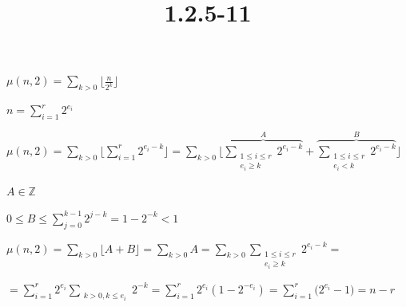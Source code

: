 \documentclass{article}
\title{1.2.5-11}
\begin{document}
\maketitle

\( \mu(n,2) = \sum_{k > 0}{\lfloor{\frac{n}{2^k}}\rfloor} \)

\( n = \sum_{i=1}^r 2^{e_i} \)

\( \mu(n,2) = \sum_{k > 0}{\lfloor{\sum_{i=1}^r 2^{e_i-k}}\rfloor} = \sum_{k > 0}{\lfloor{\overbrace{\sum_{\substack{1 \leq i \leq r\\ e_i \geq k}} 2^{e_i-k}}^A + \overbrace{\sum_{\substack{1 \leq i \leq r\\ e_i < k}} 2^{e_i-k}}^B }\rfloor} \)

\( A \in \mathbb{Z} \)

\( 0 \leq B \leq \sum_{j=0}^{k-1} 2^{j-k} = 1 - 2^{-k} < 1 \)

\( \mu(n,2) = \sum_{k > 0}{\lfloor{A+B}\rfloor} = \sum_{k > 0} A = \sum_{k>0} \sum_{\substack{1 \leq i \leq r\\ e_i \geq k}} 2^{e_i-k} = \)

\( = \sum_{i=1}^r 2^{e_i} \sum_{\substack{k>0, k \leq e_i}}{2^{-k}} = \sum_{i=1}^r{2^{e_i}(1-2^{-e_i})} = \sum_{i=1}^r({2^{e_i}-1)} = n - r \)
\end{document}
